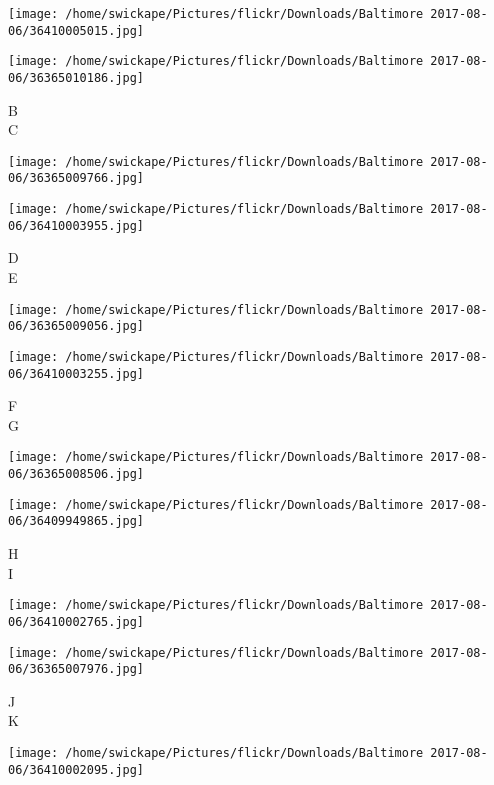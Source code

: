 \documentclass[10pt,letterpaper]{article}
\begin{document}
\texttt{[image: /home/swickape/Pictures/flickr/Downloads/Baltimore 2017-08-06/36410005015.jpg]}

\vspace{0.25in}
\texttt{[image: /home/swickape/Pictures/flickr/Downloads/Baltimore 2017-08-06/36365010186.jpg]}

B\\
C\\
\pagebreak

\texttt{[image: /home/swickape/Pictures/flickr/Downloads/Baltimore 2017-08-06/36365009766.jpg]}

\vspace{0.25in}
\texttt{[image: /home/swickape/Pictures/flickr/Downloads/Baltimore 2017-08-06/36410003955.jpg]}

D\\
E\\
\pagebreak

\texttt{[image: /home/swickape/Pictures/flickr/Downloads/Baltimore 2017-08-06/36365009056.jpg]}

\vspace{0.25in}
\texttt{[image: /home/swickape/Pictures/flickr/Downloads/Baltimore 2017-08-06/36410003255.jpg]}

F\\
G\\
\pagebreak

\texttt{[image: /home/swickape/Pictures/flickr/Downloads/Baltimore 2017-08-06/36365008506.jpg]}

\vspace{0.25in}
\texttt{[image: /home/swickape/Pictures/flickr/Downloads/Baltimore 2017-08-06/36409949865.jpg]}

H\\
I\\
\pagebreak

\texttt{[image: /home/swickape/Pictures/flickr/Downloads/Baltimore 2017-08-06/36410002765.jpg]}

\vspace{0.25in}
\texttt{[image: /home/swickape/Pictures/flickr/Downloads/Baltimore 2017-08-06/36365007976.jpg]}

J\\
K\\
\pagebreak

\texttt{[image: /home/swickape/Pictures/flickr/Downloads/Baltimore 2017-08-06/36410002095.jpg]}
\end{document}
